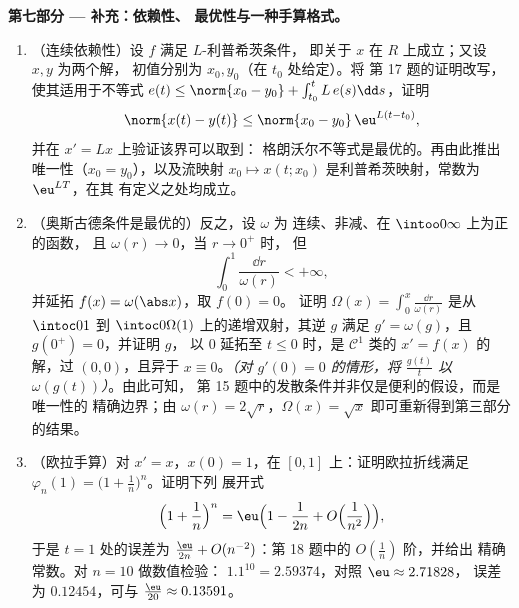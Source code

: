 \begin{problem}[{周末问题 --- 无利普希茨条件时
$x' = f(t, x)$ 解的存在性}]
\medskip
\noindent\textbf{第七部分 --- 补充：依赖性、
最优性与一种手算格式。}
\begin{enumerate}[resume]
  \item （连续依赖性）设 $f$ 满足 $L$-利普希茨条件，
        即关于 $x$ 在 $R$ 上成立；又设 $x, y$ 为两个解，
        初值分别为 $x_0, y_0$（在 $t_0$ 处给定）。将
        第 17 题的证明改写，使其适用于不等式 $e(t) \leq \norm{x_0
        - y_0} + \int_{t_0}^tL\,e(s)\dd s$，证明
        \[
        \norm{x(t) - y(t)} \leq \norm{x_0 - y_0}\,
        \eu^{L(t - t_0)},
        \]
        并在 $x' = Lx$ 上验证该界可以取到：
        格朗沃尔不等式是最优的。再由此推出唯一性（$x_0 =
        y_0$），以及流映射 $x_0 \mapsto x(t; x_0)$
        是利普希茨映射，常数为 $\eu^{LT}$，在其
        有定义之处均成立。
  \item （奥斯古德条件是最优的）反之，设 $\omega$ 为
        连续、非减、在 $\intoo0\infty$ 上为正的函数，
        且 $\omega(r) \to 0$，当 $r \to 0^+$ 时，
        但
        \[
        \int_0^1\frac{\dd r}{\omega(r)} < +\infty,
        \]
        并延拓 $f(x) = \omega(\abs x)$，取 $f(0) = 0$。
        证明 $\Omega(x) = \int_0^x\frac{\dd r}{\omega(r)}$
        是从 $\intoc0{1}$ 到
        $\intoc0{\Omega(1)}$ 上的递增双射，其逆 $g$ 满足 $g'
        = \omega(g)$，且 $g(0^+) = 0$，并证明 $g$，
        以 $0$ 延拓至 $t \leq 0$ 时，是
        $\mathcal C^1$ 类的 $x' = f(x)$ 的解，过 $(0, 0)$，且异于 $x \equiv
        0$。\emph{（对 $g'(0) = 0$ 的情形，将 $\frac{g(t)}t$ 以
        $\omega(g(t))$）}。由此可知，
        第 15 题中的发散条件并非仅是便利的假设，而是唯一性的
        精确边界；由
        $\omega(r) = 2\sqrt r$，$\Omega(x) = \sqrt x$ 即可重新得到第三部分的结果。
  \item （欧拉手算）对 $x' = x$，$x(0) = 1$，在
        $[0, 1]$ 上：证明欧拉折线满足
        $\varphi_n(1) = \bigl(1 + \frac1n\bigr)^n$。证明下列
        展开式
        \[
        \Bigl(1 + \frac1n\Bigr)^{n}
        = \eu\Bigl(1 - \frac1{2n} + O\Bigl(\frac1{n^2}\Bigr)
        \Bigr),
        \]
        于是 $t = 1$ 处的误差为 $\frac{\eu}{2n} +
        O(n^{-2})$：第 18 题中的 $O(\frac1n)$ 阶，并给出
        精确常数。对 $n = 10$ 做数值检验：
        $1.1^{10} = 2.59374$，对照 $\eu \approx 2.71828$，
        误差为 $0.12454$，可与 $\frac{\eu}{20}
        \approx 0.13591$。
\end{enumerate}
\end{problem}

